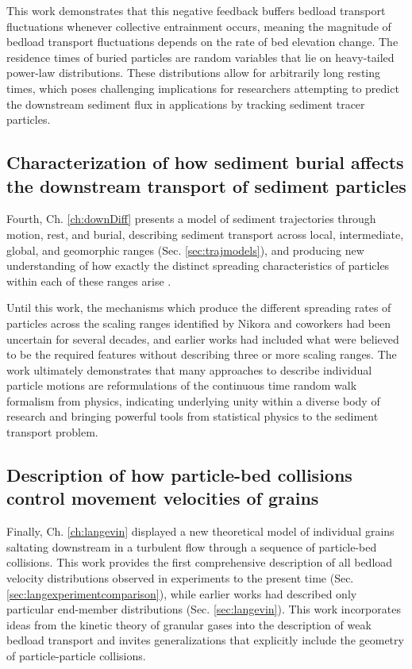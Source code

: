 This work demonstrates that this negative feedback buffers bedload transport fluctuations whenever collective entrainment occurs, meaning the magnitude of bedload transport fluctuations depends on the rate of bed elevation change. The residence times of buried particles are random variables that lie on heavy-tailed power-law distributions. These distributions allow for arbitrarily long resting times, which poses challenging implications for researchers attempting to predict the downstream sediment flux in applications by tracking sediment tracer particles. 

\subsection{Characterization of how sediment burial affects the downstream transport of sediment particles}

Fourth, Ch. \ref{ch:downDiff} presents a model of sediment trajectories through motion, rest, and burial, describing sediment transport across local, intermediate, global, and geomorphic ranges (Sec. \ref{sec:trajmodels}), and producing new understanding of how exactly the distinct spreading characteristics of particles within each of these ranges arise \citep[e.g][]{Pretzlav2021}.

Until this work, the mechanisms which produce the different spreading rates of particles across the scaling ranges identified by Nikora and coworkers had been uncertain for several decades, and earlier works had included what were believed to be the required features without describing three or more scaling ranges. 
The work ultimately demonstrates that many approaches to describe individual particle motions are reformulations of the continuous time random walk formalism from physics, indicating underlying unity within a diverse body of research and bringing powerful tools from statistical physics to the sediment transport problem.

\subsection{Description of how particle-bed collisions control movement velocities of grains}

Finally, Ch. \ref{ch:langevin} displayed a new theoretical model of individual grains saltating downstream in a turbulent flow through a sequence of particle-bed collisions.
This work provides the first comprehensive description of all bedload velocity distributions observed in experiments to the present time (Sec. \ref{sec:langexperimentcomparison}), while earlier works had described only particular end-member distributions (Sec. \ref{sec:langevin}).
This work incorporates ideas from the kinetic theory of granular gases into the description of weak bedload transport and invites generalizations that explicitly include the geometry of particle-particle collisions. 

